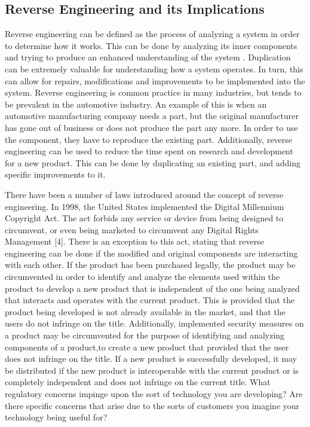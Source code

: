 \documentclass[12pt,letterpaper]{article}
\begin{document}
\subsection{Reverse Engineering and its Implications}
Reverse engineering can be defined as the process of analyzing a system in order to determine how it works. This can be done by analyzing its inner components and trying to produce an enhanced understanding of the system \cite{reverseengineering}.
Duplication can be extremely valuable for understanding how a system operates.  In turn, this can allow for repairs, modifications and improvements to be implemented into the system\cite{reverseengineering}.
Reverse engineering is common practice in many industries, but tends to be prevalent in the automotive industry. An example of this is when an automotive manufacturing company needs a part, but the original manufacturer has gone out of business or does not produce the part any more. In order to use the component, they have to reproduce the existing part. Additionally, reverse engineering can be used to reduce the time spent on research and development for a new product.  This can be done by duplicating an existing part, and adding specific improvements to it\cite{reverseengineering2}.
\par
There have been a number of laws introduced around the concept of reverse engineering. In 1998, the United States implemented the Digital Millennium Copyright Act. The act forbids any service or device from being designed to circumvent, or even being marketed to circumvent any Digital Rights Management [4]. There is an exception to this act, stating that reverse engineering can be done if the modified and original components are interacting with each other.
If the product has been purchased legally, the product may be circumvented in order to identify and analyze the elements used within the product to develop a new product that is independent of the one being analyzed that interacts and operates with the current product. This is provided that the product being developed is not already available in the market, and that the users do not infringe on the title.
Additionally, implemented security measures on a product may be circumvented for the purpose of identifying and analyzing components of a product,to create a new product that provided that the user does not infringe on the title.
If a new product is successfully developed, it may be distributed if the new product is interoperable with the current product or is completely independent and does not infringe on the current title.
What regulatory concerns impinge upon the sort of technology you are developing?  Are there specific concerns that arise due to the sorts of customers you imagine your technology being useful for?
\end{document}
